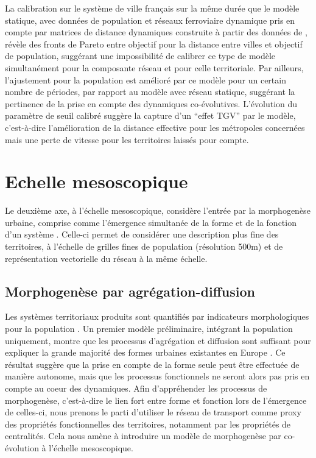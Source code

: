 \documentclass[11pt]{article}
\begin{document}
La calibration sur le système de ville français sur la même durée que le modèle statique, avec données de population et réseaux ferroviaire dynamique pris en compte par matrices de distance dynamiques construite à partir des données de \cite{thevenin2013mapping}, révèle des fronts de Pareto entre objectif pour la distance entre villes et objectif de population, suggérant une impossibilité de calibrer ce type de modèle simultanément pour la composante réseau et pour celle territoriale. Par ailleurs, l'ajustement pour la population est amélioré par ce modèle pour un certain nombre de périodes, par rapport au modèle avec réseau statique, suggérant la pertinence de la prise en compte des dynamiques co-évolutives. L'évolution du paramètre de seuil calibré suggère la capture d'un ``effet TGV'' par le modèle, c'est-à-dire l'amélioration de la distance effective pour les métropoles concernées mais une perte de vitesse pour les territoires laissés pour compte.


\section{Echelle mesoscopique}

Le deuxième axe, à l'échelle mesoscopique, considère l'entrée par la morphogenèse urbaine, comprise comme l'émergence simultanée de la forme et de la fonction d'un système \citep{doursat2012morphogenetic}. Celle-ci permet de considérer une description plus fine des territoires, à l'échelle de grilles fines de population (résolution 500m) et de représentation vectorielle du réseau à la même échelle. 

\subsection{Morphogenèse par agrégation-diffusion}

Les systèmes territoriaux produits sont quantifiés par indicateurs morphologiques pour la population \citep{le2015forme}. Un premier modèle préliminaire, intégrant la population uniquement, montre que les processus d'agrégation et diffusion sont suffisant pour expliquer la grande majorité des formes urbaines existantes en Europe \citep{raimbault2018calibration}. Ce résultat suggère que la prise en compte de la forme seule peut être effectuée de manière autonome, mais que les processus fonctionnels ne seront alors pas pris en compte au coeur des dynamiques. Afin d'appréhender les processus de morphogenèse, c'est-à-dire le lien fort entre forme et fonction lors de l'émergence de celles-ci, nous prenons le parti d'utiliser le réseau de transport comme proxy des propriétés fonctionnelles des territoires, notamment par les propriétés de centralités. Cela nous amène à introduire un modèle de morphogenèse par co-évolution à l'échelle mesoscopique.
\end{document}
